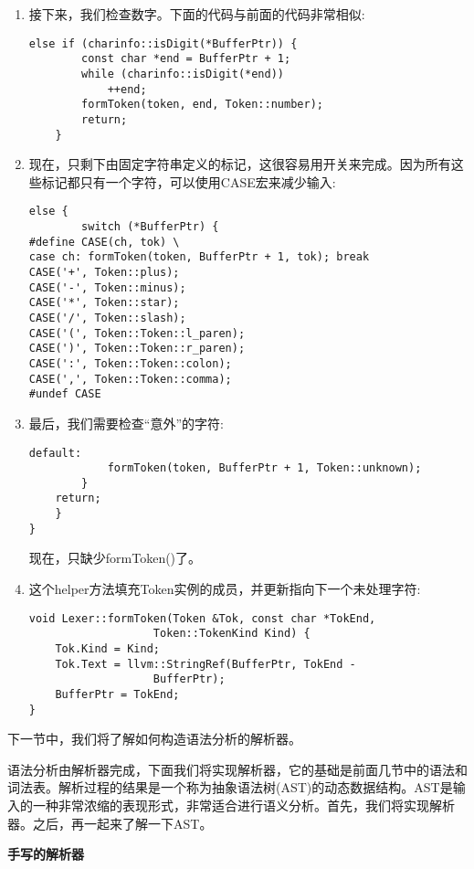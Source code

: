 \begin{enumerate}
\item 接下来，我们检查数字。下面的代码与前面的代码非常相似:
\begin{lstlisting}[caption={}]
	else if (charinfo::isDigit(*BufferPtr)) {
		const char *end = BufferPtr + 1;
		while (charinfo::isDigit(*end))
			++end;
		formToken(token, end, Token::number);
		return;
	}
\end{lstlisting}

\item 现在，只剩下由固定字符串定义的标记，这很容易用开关来完成。因为所有这些标记都只有一个字符，可以使用CASE宏来减少输入:
\begin{lstlisting}[caption={}]
	else {
		switch (*BufferPtr) {
#define CASE(ch, tok) \
case ch: formToken(token, BufferPtr + 1, tok); break
CASE('+', Token::plus);
CASE('-', Token::minus);
CASE('*', Token::star);
CASE('/', Token::slash);
CASE('(', Token::Token::l_paren);
CASE(')', Token::Token::r_paren);
CASE(':', Token::Token::colon);
CASE(',', Token::Token::comma);
#undef CASE
\end{lstlisting}

\item 最后，我们需要检查“意外”的字符:
\begin{lstlisting}[caption={}]
		default:
			formToken(token, BufferPtr + 1, Token::unknown);
		}
	return;
	}
}
\end{lstlisting}
现在，只缺少formToken()了。

\item 这个helper方法填充Token实例的成员，并更新指向下一个未处理字符:
\begin{lstlisting}[caption={}]
void Lexer::formToken(Token &Tok, const char *TokEnd,
                   Token::TokenKind Kind) {
	Tok.Kind = Kind;
	Tok.Text = llvm::StringRef(BufferPtr, TokEnd -
				   BufferPtr);
	BufferPtr = TokEnd;
}
\end{lstlisting}
\end{enumerate}

下一节中，我们将了解如何构造语法分析的解析器。\par

语法分析由解析器完成，下面我们将实现解析器，它的基础是前面几节中的语法和词法表。解析过程的结果是一个称为抽象语法树(AST)的动态数据结构。AST是输入的一种非常浓缩的表现形式，非常适合进行语义分析。首先，我们将实现解析器。之后，再一起来了解一下AST。\par


\hspace*{\fill} \par %
\textbf{手写的解析器}

